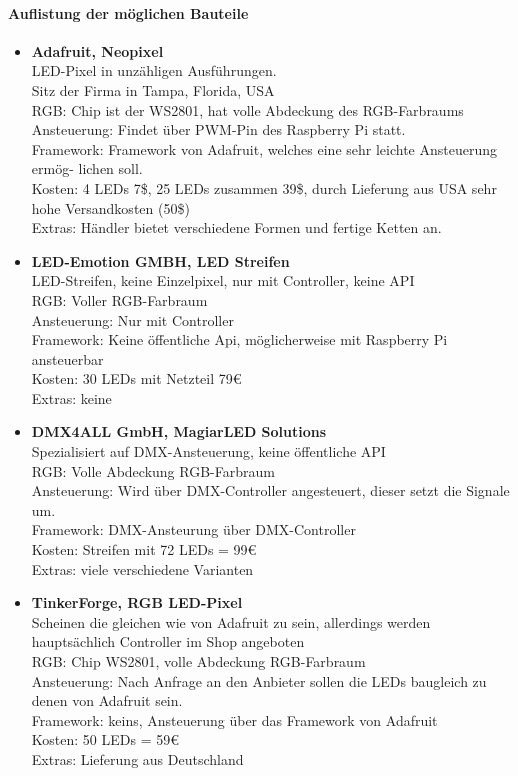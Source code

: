 \paragraph{Auflistung der möglichen Bauteile}
\begin{itemize}
\item \textbf{Adafruit, Neopixel}\cite{neopixel} \\
LED-Pixel in unzähligen Ausführungen. \\
Sitz der Firma in Tampa, Florida, USA \\
RGB: Chip ist der WS2801\cite{ws2801}, hat volle Abdeckung des RGB-Farbraums \\
Ansteuerung: Findet über PWM-Pin des Raspberry Pi statt. \\
Framework: Framework von Adafruit, welches eine sehr leichte Ansteuerung ermög- lichen soll. \\
Kosten: 4 LEDs  7\$, 25 LEDs zusammen  39\$, durch Lieferung aus USA sehr hohe Versandkosten (50\$) \\
Extras: Händler bietet verschiedene Formen und fertige Ketten an. \\

\item \textbf{LED-Emotion GMBH, LED Streifen}\cite{ledemotiongmbh} \\
LED-Streifen, keine Einzelpixel, nur mit Controller, keine API \\
RGB: Voller RGB-Farbraum \\
Ansteuerung: Nur mit Controller  \\
Framework: Keine öffentliche Api, möglicherweise mit Raspberry Pi ansteuerbar  \\
Kosten: 30 LEDs mit Netzteil 79€   \\
Extras: keine

\item \textbf{DMX4ALL GmbH, MagiarLED Solutions}\cite{dmx4all} \\
Spezialisiert auf DMX-Ansteuerung, keine öffentliche API \\
RGB: Volle Abdeckung RGB-Farbraum \\
Ansteuerung: Wird über DMX-Controller angesteuert, dieser setzt die Signale um. \\
Framework: DMX-Ansteurung über DMX-Controller \\
Kosten: Streifen mit 72 LEDs = 99€ \\
Extras: viele verschiedene Varianten

\item \textbf{TinkerForge, RGB LED-Pixel}\cite{tinkerforge} \\
Scheinen die gleichen wie von Adafruit zu sein, allerdings werden hauptsächlich Controller im Shop angeboten \\
RGB: Chip WS2801, volle Abdeckung RGB-Farbraum \\
Ansteuerung: Nach Anfrage an den Anbieter sollen die LEDs baugleich zu denen von Adafruit sein.  \\
Framework: keins, Ansteuerung über das Framework von Adafruit \\
Kosten: 50 LEDs = 59€ \\
Extras: Lieferung aus Deutschland
\end{itemize}

